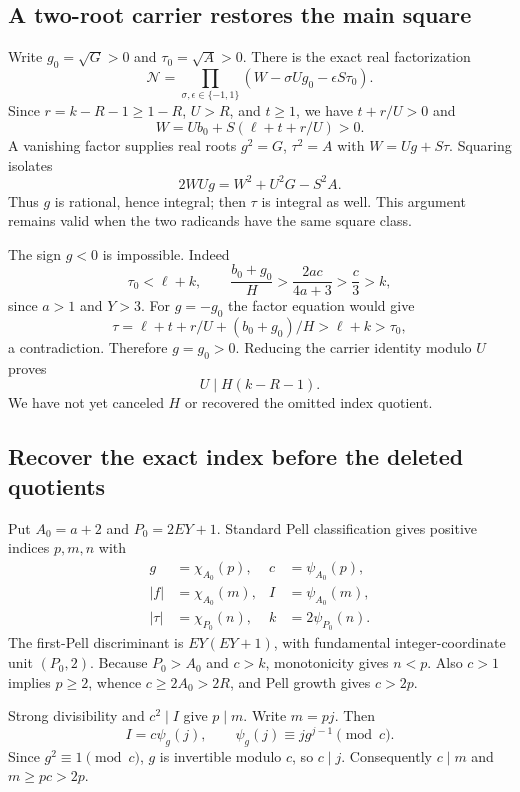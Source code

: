 \subsection{A two-root carrier restores the main square}

Write $g_0=\sqrt G>0$ and $\tau_0=\sqrt A>0$.  There is the exact real
factorization
\begin{equation}
 \mathcal N=\prod_{\sigma,\epsilon\in\{-1,1\}}
       (W-\sigma Ug_0-\epsilon S\tau_0).
 \label{eq:main-four-factors}
\end{equation}
Since $r=k-R-1\ge1-R$, $U>R$, and $t\ge1$, we have $t+r/U>0$ and
\[
 W=Ub_0+S(\ell+t+r/U)>0.
\]
A vanishing factor supplies real roots $g^2=G$, $\tau^2=A$ with
$W=Ug+S\tau$.  Squaring isolates
\[
 2WU g=W^2+U^2G-S^2A.
\]
Thus $g$ is rational, hence integral; then $\tau$ is integral as well.
This argument remains valid when the two radicands have the same square
class.

The sign $g<0$ is impossible.  Indeed
\[
 \tau_0<\ell+k,\qquad
 \frac{b_0+g_0}{H}>\frac{2ac}{4a+3}>\frac c3>k,
\]
since $a>1$ and $Y>3$.  For $g=-g_0$ the factor equation would give
\[
 \tau=\ell+t+r/U+(b_0+g_0)/H>\ell+k>\tau_0,
\]
a contradiction.  Therefore $g=g_0>0$.  Reducing the carrier identity
modulo $U$ proves
\begin{equation}
 U\mid H(k-R-1).
 \label{eq:low-weak-divisibility}
\end{equation}
We have not yet canceled $H$ or recovered the omitted index quotient.

\subsection{Recover the exact index before the deleted quotients}

Put $A_0=a+2$ and $P_0=2EY+1$.  Standard Pell classification gives
positive indices $p,m,n$ with
\begin{align*}
 g&=\chi_{A_0}(p),&c&=\psi_{A_0}(p),\\
 |f|&=\chi_{A_0}(m),&I&=\psi_{A_0}(m),\\
 |\tau|&=\chi_{P_0}(n),&k&=2\psi_{P_0}(n).
\end{align*}
The first-Pell discriminant is $EY(EY+1)$, with fundamental
integer-coordinate unit $(P_0,2)$.  Because $P_0>A_0$ and $c>k$,
monotonicity gives $n<p$.  Also $c>1$ implies $p\ge2$, whence
$c\ge2A_0>2R$, and Pell growth gives $c>2p$.

Strong divisibility and $c^2\mid I$ give $p\mid m$.  Write $m=pj$.
Then
\[
 I=c\psi_g(j),\qquad \psi_g(j)\equiv jg^{j-1}\pmod c.
\]
Since $g^2\equiv1\pmod c$, $g$ is invertible modulo $c$, so $c\mid j$.
Consequently $c\mid m$ and $m\ge pc>2p$.

